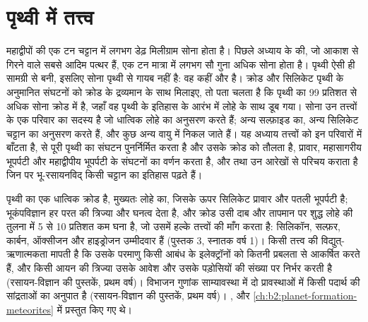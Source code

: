 \chapter{पृथ्वी में तत्त्व}\label{ch:b2:elements-in-the-earth}

महाद्वीपों की एक टन चट्टान में लगभग डेढ़ मिलीग्राम सोना होता है। पिछले
अध्याय के  की, जो आकाश से गिरने वाले सबसे आदिम पत्थर हैं,
एक टन मात्रा में लगभग सौ गुना अधिक सोना होता है। पृथ्वी ऐसी ही सामग्री से
बनी, इसलिए सोना पृथ्वी से गायब नहीं है: वह कहीं और है। क्रोड और
सिलिकेट पृथ्वी के अनुमानित संघटनों को क्रोड के द्रव्यमान के साथ मिलाइए, तो पता चलता है कि
पृथ्वी का 99 प्रतिशत से अधिक सोना क्रोड में है, जहाँ वह पृथ्वी के इतिहास के
आरंभ में लोहे के साथ डूब गया। सोना उन तत्त्वों के एक परिवार का सदस्य है जो धात्विक
लोहे का अनुसरण करते हैं; अन्य सल्फ़ाइड का, अन्य
सिलिकेट चट्टान का अनुसरण करते हैं, और कुछ अन्य
वायु में निकल जाते हैं। यह अध्याय तत्त्वों को इन परिवारों में बाँटता है,
 से पूरी पृथ्वी का संघटन पुनर्निर्मित करता है और उसके क्रोड को तौलता है,
प्रावार, महासागरीय भूपर्पटी और महाद्वीपीय भूपर्पटी के संघटनों का वर्णन करता है, और
 तथा उन आरेखों से परिचय कराता है जिन पर भू-रसायनविद्
किसी चट्टान का इतिहास पढ़ते हैं।

\begin{recall}
पृथ्वी का एक धात्विक क्रोड है, मुख्यतः लोहे का, जिसके ऊपर सिलिकेट प्रावार और पतली
भूपर्पटी है; भूकंपविज्ञान हर परत की त्रिज्या और घनत्व देता है, और क्रोड
उसी दाब और तापमान पर शुद्ध लोहे की तुलना में 5 से 10 प्रतिशत कम घना है,
जो उसमें हल्के तत्त्वों की माँग करता है: सिलिकॉन, सल्फ़र, कार्बन,
ऑक्सीजन और हाइड्रोजन उम्मीदवार हैं (पुस्तक 3, स्नातक वर्ष 1)। किसी तत्त्व की
विद्युत्-ऋणात्मकता मापती है कि उसके परमाणु किसी आबंध के इलेक्ट्रॉनों को कितनी प्रबलता से
आकर्षित करते हैं, और किसी आयन की त्रिज्या उसके आवेश और उसके पड़ोसियों की संख्या पर
निर्भर करती है (रसायन-विज्ञान की पुस्तकें, प्रथम वर्ष)। विभाजन
गुणांक साम्यावस्था में दो प्रावस्थाओं में किसी पदार्थ की सांद्रताओं का
अनुपात है (रसायन-विज्ञान की पुस्तकें, प्रथम वर्ष)। ,  और 
\cref{ch:b2:planet-formation-meteorites} में प्रस्तुत किए गए थे।
\end{recall}

